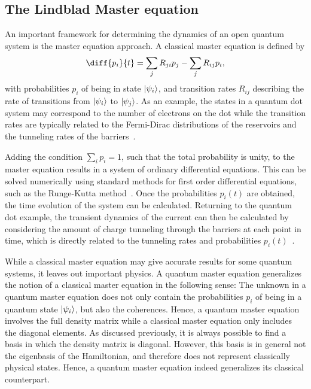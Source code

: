 \documentclass[../main.tex]{subfiles}
\begin{document}
\subsection{The Lindblad Master equation}\label{sec:lind}
An important framework for determining the dynamics of an open quantum system is the master equation approach. A classical master equation is defined by
\begin{equation}\label{master}
    \diff{p_i}{t} = \sum_j R_{ji}p_j  - \sum_j R_{ij}p_i,
\end{equation}
with probabilities $p_i$ of being in state $\ket{\psi_i}$, and transition rates $R_{ij}$ describing the rate of transitions from $\ket{\psi_i}$ to $\ket{\psi_j}$. As an example, the states in a quantum dot system may correspond to the number of electrons on the dot while the transition rates are typically related to the Fermi-Dirac distributions of the reservoirs and the tunneling rates of the barriers~\cite{transport}.

Adding the condition $\sum_i p_i = 1$, such that the total probability is unity, to the master equation results in a system of ordinary differential equations. This can be solved numerically using standard methods for first order differential equations, such as the Runge-Kutta method~\cite{iserles}. Once the probabilities $p_i(t)$ are obtained, the time evolution of the system can be calculated. Returning to the quantum dot example, the transient dynamics of the current can then be calculated by considering the amount of charge tunneling through the barriers at each point in time, which is directly related to the tunneling rates and probabilities $p_i(t)$~\cite{transport}.

While a classical master equation may give accurate results for some quantum systems, it leaves out important physics. A quantum master equation generalizes the notion of a classical master equation in the following sense: The unknown in a quantum master equation does not only contain the probabilities $p_i$ of being in a quantum state $\ket{\psi_i}$, but also the coherences. Hence, a quantum master equation involves the full density matrix while a classical master equation only includes the diagonal elements. As discussed previously, it is always possible to find a basis in which the density matrix is diagonal. However, this basis is in general not the eigenbasis of the Hamiltonian, and therefore does not represent classically physical states. Hence, a quantum master equation indeed generalizes its classical counterpart.
\end{document}
